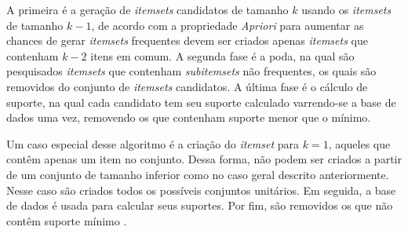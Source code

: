 A primeira é a geração de \emph{itemsets} candidatos de tamanho \(k\) usando os \emph{itemsets} de tamanho \(k-1\), de acordo com a propriedade \emph{Apriori} para aumentar as chances de gerar \emph{itemsets} frequentes devem ser criados apenas \emph{itemsets} que contenham \(k-2\) itens em comum. A segunda fase é a poda, na qual são pesquisados \emph{itemsets} que contenham \emph{subitemsets} não frequentes, os quais são removidos do conjunto de \emph{itemsets} candidatos. A última fase é o cálculo de suporte, na qual cada candidato tem seu suporte calculado varrendo-se a base de dados uma vez, removendo os que contenham suporte menor que o mínimo. 

Um caso especial desse algoritmo é a criação do \emph{itemset} para \(k = 1\), aqueles que contêm apenas um item no conjunto. Dessa forma, não podem ser criados a partir de um conjunto de tamanho inferior como no caso geral descrito anteriormente. Nesse caso são criados todos os possíveis conjuntos unitários. Em seguida, a base de dados é usada para calcular seus suportes. Por fim, são removidos os que não contêm suporte mínimo \cite{HanKamber2011}.
